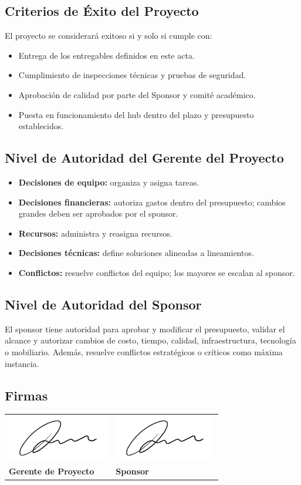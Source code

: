 \subsection{Criterios de Éxito del Proyecto}

El proyecto se considerará exitoso si y solo si cumple con:
\begin{itemize}
    \item Entrega de los entregables definidos en este acta.
    \item Cumplimiento de inspecciones técnicas y pruebas de seguridad.
    \item Aprobación de calidad por parte del Sponsor y comité académico.
    \item Puesta en funcionamiento del hub dentro del plazo y presupuesto establecidos.
\end{itemize}

\subsection{Nivel de Autoridad del Gerente del Proyecto}

\begin{itemize}
    \item \textbf{Decisiones de equipo:} organiza y asigna tareas.
    \item \textbf{Decisiones financieras:} autoriza gastos dentro del presupuesto; cambios grandes deben ser aprobados por el sponsor.
    \item \textbf{Recursos:} administra y reasigna recursos.
    \item \textbf{Decisiones técnicas:} define soluciones alineadas a lineamientos.
    \item \textbf{Conflictos:} resuelve conflictos del equipo; los mayores se escalan al sponsor.
\end{itemize}

\subsection{Nivel de Autoridad del Sponsor}

El sponsor tiene autoridad para aprobar y modificar el presupuesto, validar el alcance y autorizar cambios de costo, tiempo, calidad, infraestructura, tecnología o mobiliario. Además, resuelve conflictos estratégicos o críticos como máxima instancia.

\subsection{Firmas}

\begin{tabularx}{\textwidth}{XX}
\includegraphics[height=2cm]{Figures/0. General/fake-signature.jpg} & \includegraphics[height=2cm]{Figures/0. General/fake-signature.jpg} \\
\centering \textbf{Gerente de Proyecto} & \centering \textbf{Sponsor} \\
\end{tabularx}
